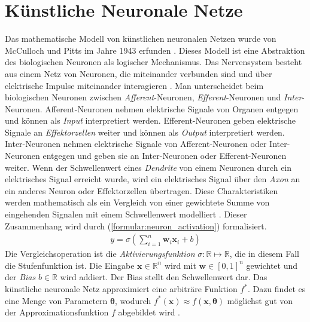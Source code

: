 \chapter{Künstliche Neuronale Netze}
Das mathematische Modell von künstlichen neuronalen Netzen wurde von McCulloch und Pitts im Jahre 1943 erfunden \cite{mcculloch1943logical}.
Dieses Modell ist eine Abstraktion des biologischen Neuronen als logischer Mechanismus.
\newline
\newline
Das Nervensystem besteht aus einem Netz von Neuronen, die miteinander verbunden sind und über elektrische Impulse miteinander interagieren \cite{rosenblatt1961principles}.
Man unterscheidet beim biologischen Neuronen zwischen \textit{Afferent}-Neuronen, \textit{Efferent}-Neuronen und \textit{Inter}-Neuronen.
Afferent-Neuronen nehmen elektrische Signale von Organen entgegen und können als \textit{Input} interpretiert werden.
Efferent-Neuronen geben elektrische Signale an \textit{Effektorzellen} weiter und können als \textit{Output} interpretiert werden.
Inter-Neuronen nehmen elektrische Signale von Afferent-Neuronen oder Inter-Neuronen entgegen und geben sie an Inter-Neuronen oder Efferent-Neuronen weiter.
Wenn der Schwellenwert eines \textit{Dendrite} von einem Neuronen durch ein elektrisches Signal erreicht wurde, wird ein elektrisches Signal über den \textit{Axon} an ein
anderes Neuron oder Effektorzellen übertragen.
\newline
\newline
Diese Charakteristiken werden mathematisch als ein Vergleich von einer gewichtete Summe von eingehenden Signalen mit einem Schwellenwert modelliert \cite{higham2019deep}.
Dieser Zusammenhang wird durch (\ref{formular:neuron_activation}) formalisiert.
\begin{align}
    \label{formular:neuron_activation}
    y = \sigma(\sum_{i=1}^n\textbf{w}_i\textbf{x}_i + b)
\end{align}
Die Vergleichsoperation ist die \textit{Aktivierungsfunktion} $\sigma: \mathbb{R}\mapsto\mathbb{R}$, die in diesem Fall die Stufenfunktion ist.
Die Eingabe $\textbf{x}\in\mathbb{R}^n$ wird mit $\textbf{w}\in[0, 1]^n$ gewichtet und der \textit{Bias} $b\in\mathbb{R}$ wird addiert. Der Bias stellt den Schwellenwert dar.
\newpage
Das künstliche neuronale Netz approximiert eine arbiträre Funktion $f^*$. Dazu findet es eine Menge von Parametern $\boldsymbol\theta$, wodurch $f^*(\textbf{x})\approx f(\textbf{x}, \boldsymbol\theta)$
möglichst gut von der Approximationsfunktion $f$ abgebildet wird \cite{bengio2017deep}.

